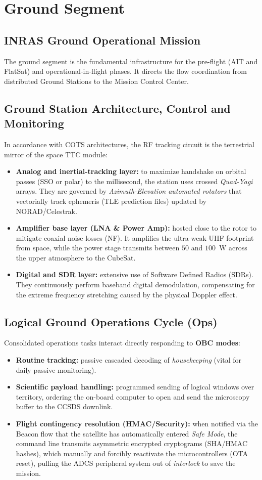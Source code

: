 \chapter{Ground Segment}

\section{INRAS Ground Operational Mission}
The ground segment is the fundamental infrastructure for the pre-flight (AIT and FlatSat) and operational-in-flight phases. It directs the flow coordination from distributed Ground Stations to the Mission Control Center.

\section{Ground Station Architecture, Control and Monitoring}
In accordance with COTS architectures, the RF tracking circuit is the terrestrial mirror of the space TTC module:
\begin{itemize}
    \item \textbf{Analog and inertial-tracking layer:} to maximize handshake on orbital passes (SSO or polar) to the millisecond, the station uses crossed \textit{Quad-Yagi} arrays. They are governed by \textit{Azimuth-Elevation automated rotators} that vectorially track ephemeris (TLE prediction files) updated by NORAD/Celestrak.
    \item \textbf{Amplifier base layer (LNA \& Power Amp):} hosted close to the rotor to mitigate coaxial noise losses (NF). It amplifies the ultra-weak UHF footprint from space, while the power stage transmits between $50$ and $100$~W across the upper atmosphere to the CubeSat.
    \item \textbf{Digital and SDR layer:} extensive use of Software Defined Radios (SDRs). They continuously perform baseband digital demodulation, compensating for the extreme frequency stretching caused by the physical Doppler effect.
\end{itemize}

\section{Logical Ground Operations Cycle (Ops)}
Consolidated operations tasks interact directly responding to \textbf{OBC modes}:
\begin{itemize}
    \item \textbf{Routine tracking:} passive cascaded decoding of \textit{housekeeping} (vital for daily passive monitoring).
    \item \textbf{Scientific payload handling:} programmed sending of logical windows over territory, ordering the on-board computer to open and send the microscopy buffer to the CCSDS downlink.
    \item \textbf{Flight contingency resolution (HMAC/Security):} when notified via the Beacon flow that the satellite has automatically entered \textit{Safe Mode}, the command line transmits asymmetric encrypted cryptograms (SHA/HMAC hashes), which manually and forcibly reactivate the microcontrollers (OTA reset), pulling the ADCS peripheral system out of \textit{interlock} to save the mission.
\end{itemize}
